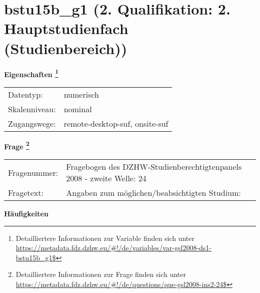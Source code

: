 
    \setcounter{footnote}{0}

    \vspace*{-1.8cm}
	\section{bstu15b\_g1 (2. Qualifikation: 2. Hauptstudienfach (Studienbereich))}
	\label{section:bstu15b_g1}



    \vspace*{0.5cm}
    \noindent\textbf{Eigenschaften
	\footnote{Detailliertere Informationen zur Variable finden sich unter
		\url{https://metadata.fdz.dzhw.eu/\#!/de/variables/var-gsl2008-ds1-bstu15b_g1$}}}\\
	\begin{tabularx}{\hsize}{@{}lX}
	Datentyp: & numerisch \\
	Skalenniveau: & nominal \\
	Zugangswege: &
	  remote-desktop-suf, 
	  onsite-suf
 \\
    \end{tabularx}



				\vspace*{0.5cm}
                \noindent\textbf{Frage
	                \footnote{Detailliertere Informationen zur Frage finden sich unter
		              \url{https://metadata.fdz.dzhw.eu/\#!/de/questions/que-gsl2008-ins2-24$}}}\\
				\begin{tabularx}{\hsize}{@{}lX}
					Fragenummer: &
					  Fragebogen des DZHW-Studienberechtigtenpanels 2008 - zweite Welle:
					  24
 \\
					Fragetext: & Angaben zum möglichen/beabsichtigten Studium: \\
				\end{tabularx}





        		\vspace*{0.5cm}
                \noindent\textbf{Häufigkeiten}

